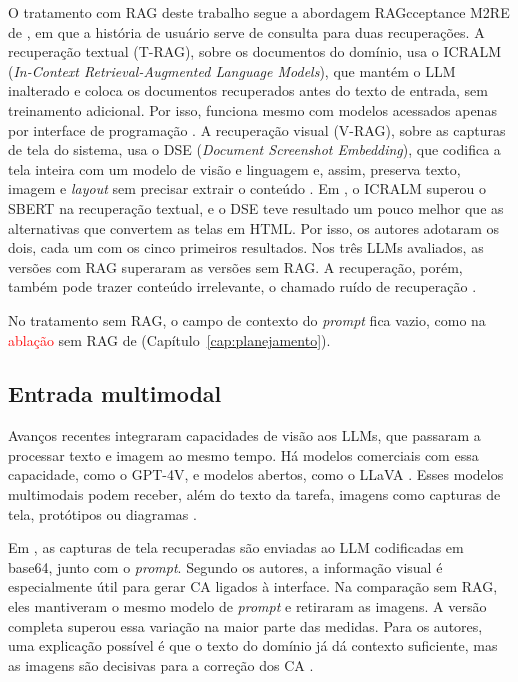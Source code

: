 O tratamento com RAG deste trabalho segue a abordagem RAGcceptance M2RE de , em que a história de usuário serve de consulta para duas recuperações. A recuperação textual (T-RAG), sobre os documentos do domínio, usa o ICRALM (\textit{In-Context Retrieval-Augmented Language Models}), que mantém o LLM inalterado e coloca os documentos recuperados antes do texto de entrada, sem treinamento adicional. Por isso, funciona mesmo com modelos acessados apenas por interface de programação \cite{ram2023}. A recuperação visual (V-RAG), sobre as capturas de tela do sistema, usa o DSE (\textit{Document Screenshot Embedding}), que codifica a tela inteira com um modelo de visão e linguagem e, assim, preserva texto, imagem e \textit{layout} sem precisar extrair o conteúdo \cite{ma2024}. Em , o ICRALM superou o SBERT na recuperação textual, e o DSE teve resultado um pouco melhor que as alternativas que convertem as telas em HTML. Por isso, os autores adotaram os dois, cada um com os cinco primeiros resultados. Nos três LLMs avaliados, as versões com RAG superaram as versões sem RAG. A recuperação, porém, também pode trazer conteúdo irrelevante, o chamado ruído de recuperação \cite{wang2025}.

No tratamento sem RAG, o campo de contexto do \textit{prompt} fica vazio, como na \textcolor{red}{ablação}  sem RAG de  (Capítulo~\ref{cap:planejamento}).

\subsection{Entrada multimodal}
\label{sec:ref-multimodal}

Avanços recentes integraram capacidades de visão aos LLMs, que passaram a processar texto e imagem ao mesmo tempo. Há modelos comerciais com essa capacidade, como o GPT-4V, e modelos abertos, como o LLaVA \cite{ma2024} .  Esses modelos multimodais podem receber, além do texto da tarefa, imagens como capturas de tela, protótipos ou diagramas \cite{wang2025,zyberaj2026}.

Em , as capturas de tela recuperadas são enviadas ao LLM codificadas em base64, junto com o \textit{prompt}. Segundo os autores, a informação visual é especialmente útil para gerar CA ligados à interface. Na comparação sem RAG, eles mantiveram o mesmo modelo de \textit{prompt} e retiraram as imagens. A versão completa superou essa variação na maior parte das medidas. Para os autores, uma explicação possível é que o texto do domínio já dá contexto suficiente, mas as imagens são decisivas para a correção dos CA \cite{wang2025}.

